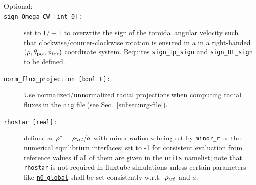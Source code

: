 \documentclass[12pt]{article}
\begin{document}
\begin{description}
\item[Optional:]
\item[\hypertarget{sign_Omega_CW}{\tt sign\_Omega\_CW [int 0]:}] set to $1/-1$ to overwrite the sign of the toroidal angular velocity such that clockwise/counter-clockwise rotation is ensured in a in a right-handed $(\rho,\theta_{\rm pol},\phi_{\rm tor})$ coordinate system. Requires {\tt sign\_Ip\_sign} and {\tt sign\_Bt\_sign} to be defined.

\item[\hypertarget{norm_flux_projection}{\tt norm\_flux\_projection [bool F]:}] Use normalized/unnormalized radial projections
when computing radial fluxes in the {\tt nrg} file (see Sec.~\ref{subsec:nrg-file}).

\item[\hypertarget{rhostar}{\tt rhostar [real]:}] defined as $\rho^* = \rho_\rf/a$ with minor radius $a$ being set by {\tt minor\_r}
or the numerical equilibrium interfaces; set to -1 for consistent evaluation from reference values if all of them are given
in the \hyperlink{units_nml}{\tt units} namelist; note that {\tt rhostar} is not required in fluxtube simulations unless certain
parameters like \hyperlink{n0_global}{\tt n0\_global} shall be set consistently w.r.t.~$\rho_\rf$ and $a$.\\

\end{description}
\end{document}
